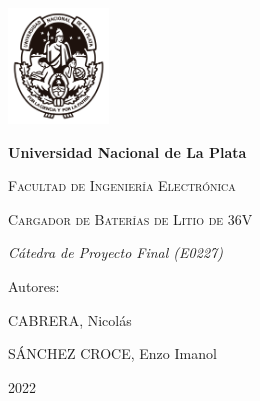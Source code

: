 \documentclass[12pt]{report}
\begin{document}
\begin{titlepage}
    \centering
    {\includegraphics[width=0.2\textwidth]{images/unlp-escudo.png}\par}
    \vspace{1cm}
    {\bfseries\LARGE Universidad Nacional de La Plata \par}
    \vspace{1cm}
    {\scshape\LARGE Facultad de Ingenier\'ia Electr\'onica \par}
    \vspace{3cm}
    {\scshape\Huge Cargador de Bater\'ias de Litio de 36V \par}
    \vspace{3cm}
    {\itshape\Large C\'atedra de Proyecto Final (E0227) \par}
    \vfill
    {\Large Autores: \par}
    {\Large CABRERA, Nicol\'as \par}
    {\Large S\'ANCHEZ CROCE, Enzo Imanol \par}
    \vfill
    {\Large 2022 \par}
\end{titlepage}
\thispagestyle{empty}
\newpage


\tableofcontents
\newpage


\printbibliography
\end{document}
